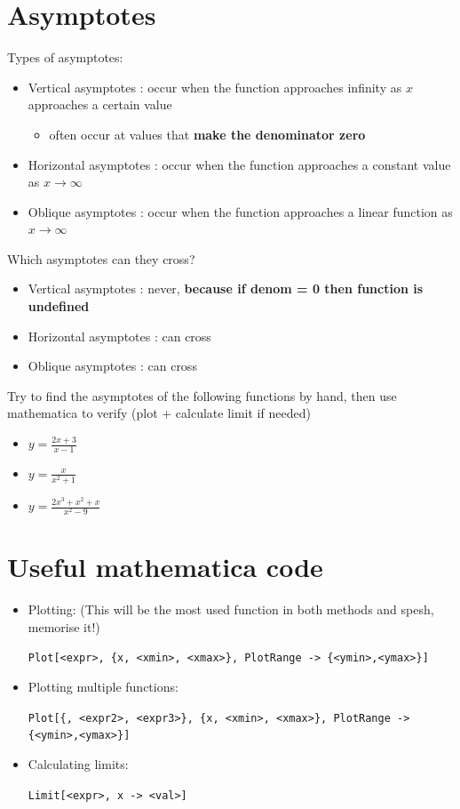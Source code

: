\documentclass[12pt]{article}
\begin{document}
\section{Asymptotes}
Types of asymptotes:
\begin{itemize}
    \item Vertical asymptotes : occur when the function approaches infinity as $x$ approaches a certain value
    \begin{itemize}
        \item often occur at values that \textbf{make the denominator zero} 
    \end{itemize}
    \item Horizontal asymptotes : occur when the function approaches a constant value as $x \to \infty$
    \item Oblique asymptotes : occur when the function approaches a linear function as $x \to \infty$
\end{itemize}

Which asymptotes can they cross?
\begin{itemize}
    \item Vertical asymptotes : never, \textbf{because if denom = 0 then function is undefined}
    \item Horizontal asymptotes : can cross
    \item Oblique asymptotes : can cross
\end{itemize}
\newpage

Try to find the asymptotes of the following functions by hand, then use mathematica to verify (plot + calculate limit if needed)
\begin{itemize}
    \item $y = \frac{2x+3}{x-1}$
    \item $y = \frac{x}{x^{2}+1}$
    \item $y = \frac{2x^{3} + x^{2} + x}{ x^{2} - 9}$
\end{itemize}


\section{Useful mathematica code}
\begin{itemize}
    \item Plotting: (This will be the most used function in both methods and spesh, memorise it!)

\texttt{Plot[<expr>, \{x, <xmin>, <xmax>\}, PlotRange -> \{<ymin>,<ymax>\}]}

    \item Plotting multiple functions:

\texttt{Plot[\{<expr1>, <expr2>, <expr3>\}, \{x, <xmin>, <xmax>\}, PlotRange -> \{<ymin>,<ymax>\}]}

    \item Calculating limits:

\texttt{Limit[<expr>, x -> <val>] }


\end{itemize}
\end{document}
